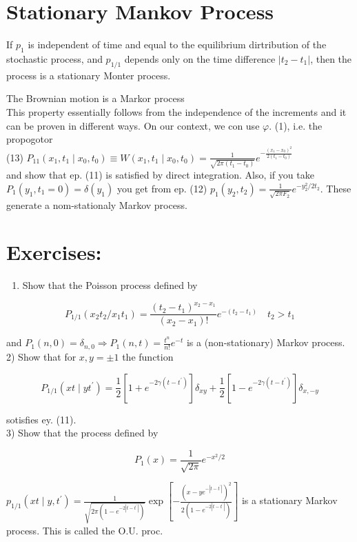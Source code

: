\documentclass[10pt]{article}
\begin{document}
\section*{Stationary Mankov Process}
If $p_{1}$ is independent of time and equal to the equilibrium dirtribution of the stochastic process, and $p_{1 / 1}$ depends only on the time difference $\left|t_{2}-t_{1}\right|$, then the process is a stationary Monter process.

The Brownian motion is a Markor process\\
This property essentially follows from the independence of the increments and it can be proven in different ways. On our context, we con use $\varphi$. (1), i.e. the propogotor\\
(13) $P_{11}\left(x_{1}, t_{1} \mid x_{0}, t_{0}\right) \equiv W\left(x_{1}, t_{1} \mid x_{0}, t_{0}\right)=\frac{1}{\sqrt{2 \pi\left(t_{1}-t_{0}\right)}} e^{-\frac{\left(x_{1}-x_{0}\right)^{2}}{2\left(t_{1}-t_{0}\right)}}$\\
and show that ep. (11) is satisfied by direct integration. Also, if you take $P_{1}\left(y_{1}, t_{1}=0\right)=\delta\left(y_{1}\right)$ you get from ep. (12) $p_{1}\left(y_{2}, t_{2}\right)=\frac{1}{\sqrt{2 \pi F_{2}}} e^{-y_{2}^{2} / 2 t_{2}}$. These generate a nom-stationaly Markov process.

\section*{Exercises:}
\begin{enumerate}
  \item Show that the Poisson process defined by
\end{enumerate}

$$
P_{1 / 1}\left(x_{2} t_{2} / x_{1} t_{1}\right)=\frac{\left(t_{2}-t_{1}\right)^{x_{2}-x_{1}}}{\left(x_{2}-x_{1}\right)!} e^{-\left(t_{2}-t_{1}\right)} \quad t_{2}>t_{1}
$$

and $P_{1}(n, 0)=\delta_{n, 0} \Rightarrow P_{1}(n, t)=\frac{t^{n}}{n!} e^{-t}$ is a (non-stationary) Markov process.\\
2) Show that for $x, y= \pm 1$ the function

$$
P_{1 / 1}\left(x t \mid y t^{\prime}\right)=\frac{1}{2}\left[1+e^{-2 \gamma\left(t-t^{\prime}\right)}\right] \delta_{x y}+\frac{1}{2}\left[1-e^{-2 \gamma\left(t-t^{\prime}\right)}\right] \delta_{x,-y}
$$

sotisfies ey. (11).\\
3) Show that the process defined by

$$
P_{1}(x)=\frac{1}{\sqrt{2 \pi}} e^{-x^{2} / 2}
$$

$p_{1 / 1}\left(x t \mid y, t^{\prime}\right)=\frac{1}{\sqrt{2 \pi\left(1-e^{-2\left|t-t^{\prime}\right|}\right)}} \exp \left[-\frac{\left(x-y e^{-\left|t-t^{\prime}\right|}\right)^{2}}{2\left(1-e^{-2\left|t-t^{\prime}\right|}\right)}\right]$ is a stationary Markov process. This is called the O.U. proc.
\end{document}
